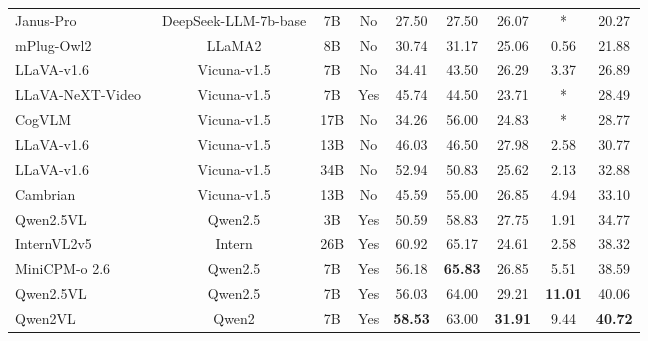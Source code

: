 \begin{table*}[!ht]
{\begin{tabular}{lcccccccc}
    Janus-Pro \cite{chen2025januspro} & DeepSeek-LLM-7b-base & 7B &No & 27.50 & 27.50 & 26.07 & *    & 20.27 \\
    mPlug-Owl2 \cite{ye2023mplugowl2} &   LLaMA2            & 8B &No  & 30.74 & 31.17 & 25.06 & 0.56 & 21.88\\
    LLaVA-v1.6 \cite{liu2023llava}  & Vicuna-v1.5           & 7B &No  & 34.41 & 43.50 & 26.29 & 3.37 & 26.89 \\
    LLaVA-NeXT-Video~\cite{zhang2024llavanextvideo}  & Vicuna-v1.5  & 7B &Yes & 45.74 & 44.50 & 23.71 & *    & 28.49 \\
    CogVLM \cite{wang2023cogvlm} & Vicuna-v1.5              & 17B &No & 34.26 & 56.00 & 24.83 & *    & 28.77 \\
    LLaVA-v1.6 \cite{liu2023llava}  & Vicuna-v1.5           & 13B&No  & 46.03 & 46.50 & 27.98 & 2.58 & 30.77 \\
    LLaVA-v1.6 \cite{liu2023llava}  & Vicuna-v1.5           & 34B &No & 52.94 & 50.83 & 25.62 & 2.13 & 32.88 \\
    Cambrian \cite{tong2024cambrian1}  & Vicuna-v1.5        & 13B &No & 45.59 & 55.00 & 26.85 & 4.94 & 33.10\\
    Qwen2.5VL \cite{qwen2.5-VL}      & Qwen2.5              & 3B  &Yes & 50.59 & 58.83 & 27.75 & 1.91 & 34.77 \\
    InternVL2v5 \cite{chen2024internvl} &   Intern          & 26B &Yes  & 60.92 & 65.17 & 24.61 & 2.58 & 38.32\\
    MiniCPM-o 2.6  \cite{yao2024minicpm} & Qwen2.5          & 7B  & Yes & 56.18 & \textbf{65.83} & 26.85 & 5.51 & 38.59\\ 
    Qwen2.5VL \cite{qwen2.5-VL} & Qwen2.5                   & 7B &Yes  & 56.03 & 64.00 & 29.21 &\textbf{ 11.01} & 40.06\\ 
    Qwen2VL \cite{Qwen2VL} & Qwen2                          & 7B &Yes & \textbf{58.53} & 63.00 & \textbf{31.91} & 9.44 & \textbf{40.72}\\
     

\end{tabular}}
\end{table*}
